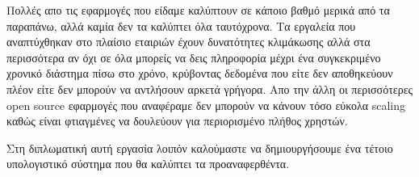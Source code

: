 Πολλές απο τις εφαρμογές που είδαμε καλύπτουν σε κάποιο βαθμό μερικά από τα παραπάνω, αλλά καμία
δεν τα καλύπτει όλα ταυτόχρονα. Τα εργαλεία που αναπτύχθηκαν στο πλαίσιο εταιριών έχουν δυνατότητες κλιμάκωσης
αλλά στα περισσότερα αν όχι σε όλα μπορείς να δεις πληροφορία μέχρι ένα συγκεκριμένο χρονικό διάστημα πίσω στο χρόνο,
κρύβοντας δεδομένα που είτε δεν αποθηκεύουν πλέον είτε δεν μπορούν να αντλήσουν αρκετά γρήγορα.
Απο την άλλη οι περισσότερες open source εφαρμογές που αναφέραμε δεν μπορούν να κάνουν τόσο εύκολα scaling
καθώς είναι φτιαγμένες να δουλεύουν για περιορισμένο πλήθος χρηστών. 

Στη διπλωματική αυτή εργασία λοιπόν καλούμαστε να δημιουργήσουμε ένα τέτοιο υπολογιστικό σύστημα
που θα καλύπτει τα προαναφερθέντα.